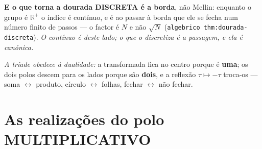 \documentclass[11pt,a4paper]{article}
\newcommand{\code}[1]{\texttt{\small #1}}
\begin{document}
\textbf{E o que torna a dourada DISCRETA é a borda}, não Mellin: enquanto o grupo é
$\mathbb{R}^{+}$ o índice é contínuo, e é ao passar à borda que ele se fecha num número
finito de passos --- o factor é $N$ e não $\sqrt N$
(\code{algebrico thm:dourada-discreta}). \emph{O contínuo é deste lado; o que o discretiza
é a passagem, e ela é canónica.}

\medskip
\noindent\emph{A tríade obedece à dualidade:} a transformada fica no centro porque é
\textbf{uma}; os dois polos descem para os lados porque são \textbf{dois}, e a reflexão
$\tau\mapsto-\tau$ troca-os --- soma $\leftrightarrow$ produto, círculo
$\leftrightarrow$ folhas, fechar $\leftrightarrow$ não fechar.

\section{As realizações do polo MULTIPLICATIVO}\label{sec:realiz-mult}
\end{document}
